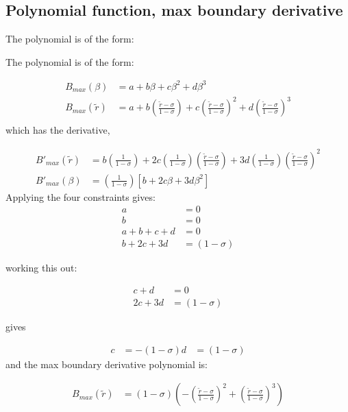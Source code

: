 \subsection{Polynomial function, max boundary derivative}
The polynomial is of the form:

The polynomial is of the form: 

\begin{align*}
    B_{max} \left( \beta \right) &= 
    a + b \beta + c \beta^2 + d \beta^3                   \\
    B_{max} \left( \widetilde{r} \right) &= 
    a + b \left( \frac{\widetilde{r} - \sigma}{1 - \sigma} \right)+
    c\left( \frac{\widetilde{r} - \sigma}{1 - \sigma} \right)  ^2+
    d\left( \frac{\widetilde{r} - \sigma}{1 - \sigma} \right)^3                    \\
\end{align*}
which has the derivative,


\begin{align*}
    B'_{max} \left( \widetilde{r} \right) &= 
    b \left( \frac{1}{1 - \sigma} \right)+
    2 c\left( \frac{1}{1 - \sigma} \right)\left( \frac{\widetilde{r} - \sigma}{1 - \sigma} \right)  +
    3 d\left( \frac{1}{1-\sigma} \right)\left( \frac{\widetilde{r} - \sigma}{1 - \sigma} \right)^2\\
    B'_{max} \left( \beta \right) &= 
    \left( \frac{1}{1 - \sigma} \right)
    \left[
    b +
    2 c \beta + 
    3 d \beta^2
    \right]
\end{align*}
Applying the four constraints gives:
\begin{align*}
    a &= 0 \\
    b &= 0 \\
    a + b + c + d &= 0 \\
    b + 2c + 3d &= (1-\sigma)
\end{align*} 

working this out: 

\begin{align*}
    c + d &=  0 \\
    2c + 3d &= (1 - \sigma)
\end{align*} 

gives 

\begin{align*}
    c &= -\left( 1 - \sigma\right)
    d &= \left( 1 - \sigma\right)
\end{align*}
and the max boundary derivative polynomial is:

\begin{align*}
    B_{max} \left( \widetilde{r} \right) &= 
    \left( 1 - \sigma \right) \left( 
        - \left( \frac{\widetilde{r}-\sigma}{1 - \sigma} \right)^2 +
        \left( \frac{\widetilde{r}-\sigma}{1-\sigma} \right)^3
    \right)
\end{align*}

